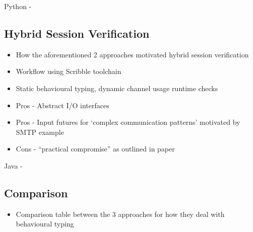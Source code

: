 Python - \cite{Python2017}

\subsection{Hybrid Session Verification}
\begin{itemize}
\item How the aforementioned 2 approaches motivated hybrid session verification
\item Workflow using Scribble toolchain 
\item Static behavioural typing, dynamic channel usage runtime checks
\item Pros - Abstract I/O interfaces
\item Pros - Input futures for `complex communication patterns' motivated by SMTP example
\item Cons - ``practical compromise'' as outlined in paper
\end{itemize}

Java - \cite{Hybrid2016}

\subsection{Comparison}
\begin{itemize}
\item Comparison table between the 3 approaches for how they deal with behavioural typing 
\end{itemize}